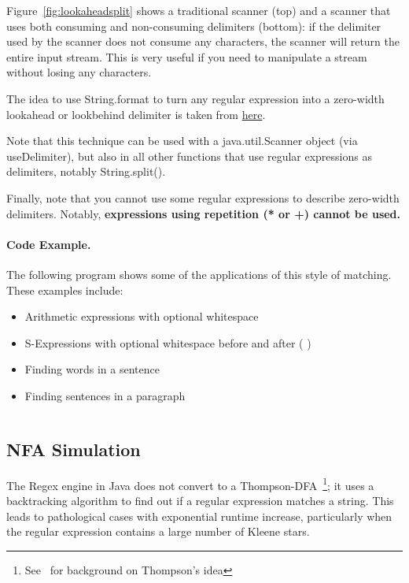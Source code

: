 Figure~\ref{fig:lookaheadsplit} shows a traditional scanner (top) and a scanner that
uses both consuming and non-consuming delimiters (bottom): 
if the delimiter used by the scanner does not consume any characters,
the scanner will return the entire input stream. This is very useful if
you need to manipulate a stream without losing any characters.

The idea to use String.format to turn any regular expression into a 
zero-width lookahead or lookbehind delimiter is taken from \href{http://stackoverflow.com/questions/2206378/how-to-split-a-string-but-also-keep-the-delimiters}{here}.

Note that this technique can be used with a java.util.Scanner object
(via useDelimiter), but also in all other functions that use regular
expressions as delimiters, notably String.split().

Finally, note that you cannot use some regular expressions to describe
zero-width delimiters. Notably, \textbf{expressions using repetition (* or +)
cannot be used.}

\paragraph{Code Example.}
The following program shows some of the applications of
this style of matching.  These examples include:
\begin{itemize}
\item Arithmetic expressions with optional whitespace
\item S-Expressions with optional whitespace before and after ( )
\item Finding words in a sentence
\item Finding sentences in a paragraph
\end{itemize}

\inputminted[fontsize=\footnotesize,linenos=true]{java}{code/Lookaround.java}

\subsection{NFA Simulation}

The Regex engine in Java does not convert to a Thompson-DFA~\footnote{See~\cite{CoxRegexp:2007} for background
on Thompson's idea}; it uses a backtracking algorithm
to find out if a regular expression matches a string.  This leads to pathological cases with
exponential runtime increase, particularly when the regular expression contains a large number
of Kleene stars.

